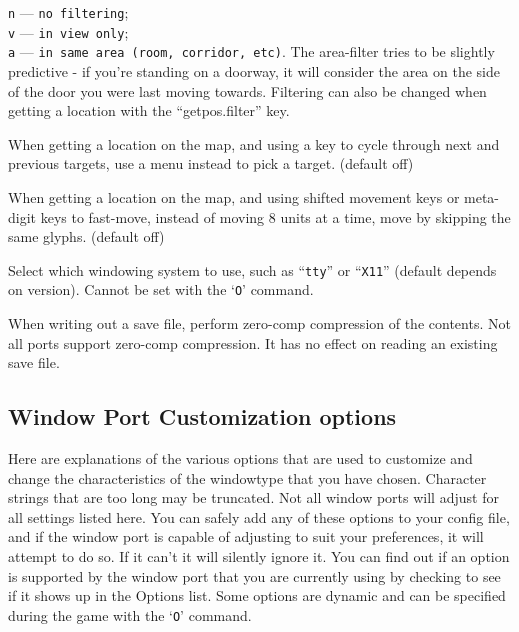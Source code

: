 {\tt n} --- \verb#no filtering#;\\
{\tt v} --- \verb#in view only#;\\
{\tt a} --- \verb#in same area (room, corridor, etc)#.
The area-filter tries to be slightly predictive - if you're standing on a doorway,
it will consider the area on the side of the door you were last moving towards.
Filtering can also be changed when getting a location with the ``getpos.filter''
key.
\item[\ib{whatis\verb+_+menu}]
When getting a location on the map, and using a key to cycle through
next and previous targets, use a menu instead to pick a target.
(default off)
\item[\ib{whatis\verb+_+moveskip}]
When getting a location on the map, and using shifted movement keys or
meta-digit keys to fast-move, instead of moving 8 units at a time,
move by skipping the same glyphs.
(default off)
\item[\ib{windowtype}]
Select which windowing system to use, such as ``{\tt tty}'' or ``{\tt X11}''
(default depends on version).
Cannot be set with the `{\tt O}' command.
\item[\ib{zerocomp}]
When writing out a save file, perform zero-comp compression of the 
contents. Not all ports support zero-comp compression. It has no effect 
on reading an existing save file.
\elist

\subsection*{Window Port Customization options}

Here are explanations of the various options that are
used to customize and change the characteristics of the
windowtype that you have chosen.
Character strings that are too long may be truncated.
Not all window ports will adjust for all settings listed
here.  You can safely add any of these options to your 
config file, and if the window port is capable of adjusting 
to suit your preferences, it will attempt to do so. If it
can't it will silently ignore it.  You can find out if an 
option is supported by the window port that you are currently
using by checking to see if it shows up in the Options list.
Some options are dynamic and can be specified during the game
with the `{\tt O}' command.

